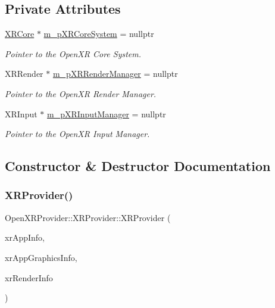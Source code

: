 \subsection*{Private Attributes}
\begin{DoxyCompactItemize}
\item 
\mbox{\hyperlink{class_open_x_r_provider_1_1_x_r_core}{X\+R\+Core}} $\ast$ \mbox{\hyperlink{class_open_x_r_provider_1_1_x_r_provider_a037329df2ed1bc10449a73033983f85c}{m\+\_\+p\+X\+R\+Core\+System}} = nullptr
\begin{DoxyCompactList}\small\item\em Pointer to the Open\+XR Core System. \end{DoxyCompactList}\item 
X\+R\+Render $\ast$ \mbox{\hyperlink{class_open_x_r_provider_1_1_x_r_provider_a3c37e01f29d070361c29efc4b5b49370}{m\+\_\+p\+X\+R\+Render\+Manager}} = nullptr
\begin{DoxyCompactList}\small\item\em Pointer to the Open\+XR Render Manager. \end{DoxyCompactList}\item 
X\+R\+Input $\ast$ \mbox{\hyperlink{class_open_x_r_provider_1_1_x_r_provider_a9fef42bd0f6dd1b68e3db499bb10eb37}{m\+\_\+p\+X\+R\+Input\+Manager}} = nullptr
\begin{DoxyCompactList}\small\item\em Pointer to the Open\+XR Input Manager. \end{DoxyCompactList}\end{DoxyCompactItemize}


\subsection{Constructor \& Destructor Documentation}
\mbox{\label{class_open_x_r_provider_1_1_x_r_provider_afa61fccc9d633ac2c4b8e1a8f07871bb}} 
\subsubsection{\texorpdfstring{XRProvider()}{XRProvider()}}
{\footnotesize\ttfamily Open\+X\+R\+Provider\+::\+X\+R\+Provider\+::\+X\+R\+Provider (\begin{DoxyParamCaption}\item[{\mbox{\hyperlink{struct_open_x_r_provider_1_1_x_r_app_info}{X\+R\+App\+Info}}}]{xr\+App\+Info,  }\item[{X\+R\+App\+Graphics\+Info}]{xr\+App\+Graphics\+Info,  }\item[{\mbox{\hyperlink{struct_open_x_r_provider_1_1_x_r_render_info}{X\+R\+Render\+Info}}}]{xr\+Render\+Info }\end{DoxyParamCaption})}

